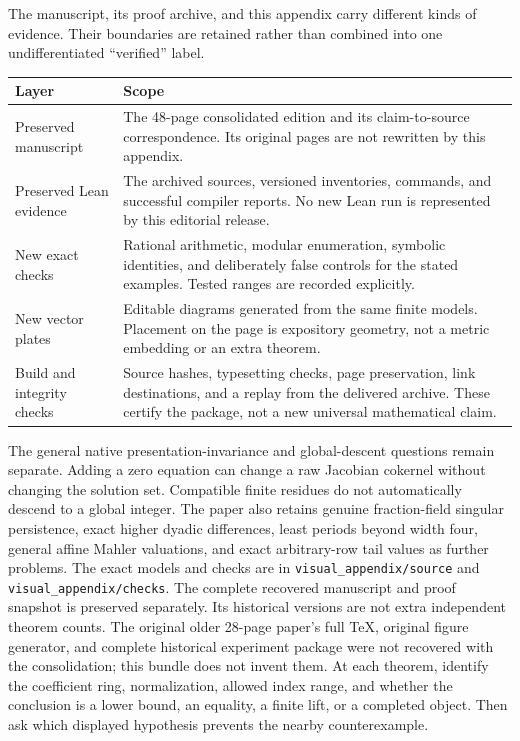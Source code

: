 The manuscript, its proof archive, and this appendix carry different kinds of evidence. Their boundaries are retained rather than combined into one undifferentiated ``verified'' label.
\par
\begin{tabularx}{\linewidth}{@{}lY@{}}\toprule
Layer & Scope\\\midrule
Preserved manuscript & The 48-page consolidated edition and its claim-to-source correspondence. Its original pages are not rewritten by this appendix.\\
Preserved Lean evidence & The archived sources, versioned inventories, commands, and successful compiler reports. No new Lean run is represented by this editorial release.\\
New exact checks & Rational arithmetic, modular enumeration, symbolic identities, and deliberately false controls for the stated examples. Tested ranges are recorded explicitly.\\
New vector plates & Editable diagrams generated from the same finite models. Placement on the page is expository geometry, not a metric embedding or an extra theorem.\\
Build and integrity checks & Source hashes, typesetting checks, page preservation, link destinations, and a replay from the delivered archive. These certify the package, not a new universal mathematical claim.\\\bottomrule
\end{tabularx}
\par
{}
The general native presentation-invariance and global-descent questions remain separate. Adding a zero equation can change a raw Jacobian cokernel without changing the solution set. Compatible finite residues do not automatically descend to a global integer. The paper also retains genuine fraction-field singular persistence, exact higher dyadic differences, least periods beyond width four, general affine Mahler valuations, and exact arbitrary-row tail values as further problems.
The exact models and checks are in \texttt{visual\_appendix/source} and \texttt{visual\_appendix/checks}. The complete recovered manuscript and proof snapshot is preserved separately. Its historical versions are not extra independent theorem counts. The original older 28-page paper's full TeX, original figure generator, and complete historical experiment package were not recovered with the consolidation; this bundle does not invent them.
At each theorem, identify the coefficient ring, normalization, allowed index range, and whether the conclusion is a lower bound, an equality, a finite lift, or a completed object. Then ask which displayed hypothesis prevents the nearby counterexample.
